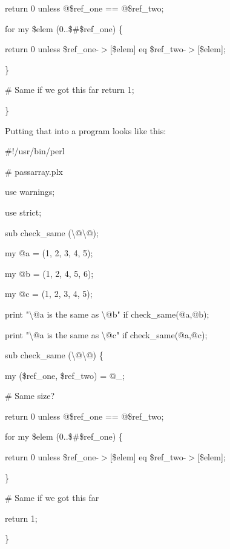 \documentclass[a4paper,11pt]{book}
\begin{document}
\noindent return 0 unless @\$ref\_one == @\$ref\_two;

\noindent for my \$elem (0..\$\#\$ref\_one) \{

\noindent return 0 unless \$ref\_one-$>$[\$elem] eq \$ref\_two-$>$[\$elem];

\noindent \}

\noindent \# Same if we got this far return 1;

\noindent \}

\noindent 

\noindent Putting that into a program looks like this:

\noindent 

\noindent \#!/usr/bin/perl

\noindent \# passarray.plx

\noindent use warnings;

\noindent use strict;

\noindent 

\noindent sub check\_same (\textbackslash @\textbackslash @);

\noindent 

\noindent my @a = (1, 2, 3, 4, 5);

\noindent my @b = (1, 2, 4, 5, 6);

\noindent my @c = (1, 2, 3, 4, 5);

\noindent print "\textbackslash @a is the same as \textbackslash @b" if check\_same(@a,@b);

\noindent print "\textbackslash @a is the same as \textbackslash @c" if check\_same(@a,@c);

\noindent 

\noindent 

\noindent sub check\_same (\textbackslash @\textbackslash @) \{

\noindent my (\$ref\_one, \$ref\_two) = @\_;

\noindent \# Same size?

\noindent return 0 unless @\$ref\_one == @\$ref\_two;

\noindent for my \$elem (0..\$\#\$ref\_one) \{

\noindent return 0 unless \$ref\_one-$>$[\$elem] eq \$ref\_two-$>$[\$elem];

\noindent \}

\noindent \# Same if we got this far

\noindent return 1;

\noindent \}

\noindent 
\end{document}
